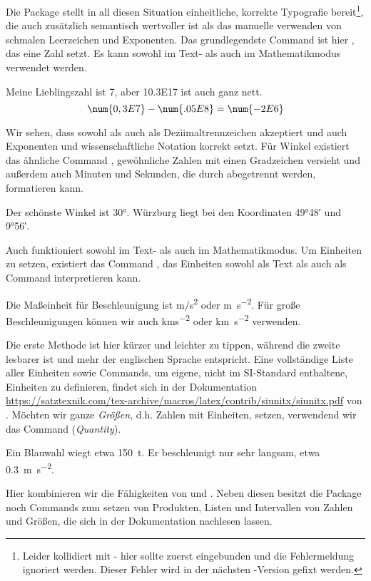 Die Package  stellt in all diesen Situation einheitliche, korrekte Typografie bereit\footnote{Leider kollidiert  mit  - hier sollte  zuerst eingebunden und die Fehlermeldung ignoriert werden. Dieser Fehler wird in der nächsten -Version gefixt werden.}, die auch zusätzlich semantisch wertvoller ist als das manuelle verwenden von schmalen Leerzeichen und Exponenten.
Das grundlegendste Command ist hier , das eine Zahl setzt.
Es kann sowohl im Text- als auch im Mathematikmodus verwendet werden.
\begin{latexlisting}
	Meine Lieblingszahl ist \num{7}, aber \num{10.3E17} ist auch ganz nett.
	\begin{equation*}
		\num{0,3E7} - \num{.05E8} = \num{-2E6}
	\end{equation*}
\end{latexlisting}
Wir sehen, dass  sowohl  als auch \key{,} als Deziimaltrennzeichen akzeptiert und auch Exponenten und wissenschaftliche Notation korrekt setzt.
Für Winkel existiert das ähnliche Command , gewöhnliche Zahlen mit einen Gradzeichen versieht und außerdem auch Minuten und Sekunden, die durch \key{;} abegetrennt werden, formatieren kann. 
\begin{latexlisting}
	Der schönste Winkel ist \ang{30}.
	Würzburg liegt bei den Koordinaten \ang{49;48} und \ang{9;56}.
\end{latexlisting}
Auch  funktioniert sowohl im Text- als auch im Mathematikmodus.
Um Einheiten zu setzen, existiert das Command , das Einheiten sowohl als Text als auch als Command interpretieren kann.
\begin{latexlisting}
	Die Maßeinheit für Beschleunigung ist \unit{m/s^2} oder \unit{\meter\per\square\second}.
	Für große Beschleunigungen können wir auch \unit{kms^{-2}} oder \unit{\kilo\meter\per\square\second} verwenden.
\end{latexlisting}
Die erste Methode ist hier kürzer und leichter zu tippen, während die zweite lesbarer ist und mehr der englischen Sprache entspricht.
Eine vollständige Liste aller Einheiten sowie Commands, um eigene, nicht im SI-Standard enthaltene, Einheiten zu definieren, findet sich in der Dokumentation \url{https://satztexnik.com/tex-archive/macros/latex/contrib/siunitx/siunitx.pdf} von .
Möchten wir ganze \emph{Größen}, d.h. Zahlen mit Einheiten, setzen, verwendend wir das Command  (\emph{Quantity}).
\begin{latexlisting}
	Ein Blauwahl wiegt etwa \qty{150}{t}.
	Er beschleunigt nur sehr langsam, etwa \qty{.3}{\meter\per\square\second}.
\end{latexlisting}
Hier kombinieren wir die Fähigkeiten von  und .
Neben diesen besitzt die Package noch Commands zum setzen von Produkten, Listen und Intervallen von Zahlen und Größen, die sich in der Dokumentation nachlesen lassen.


